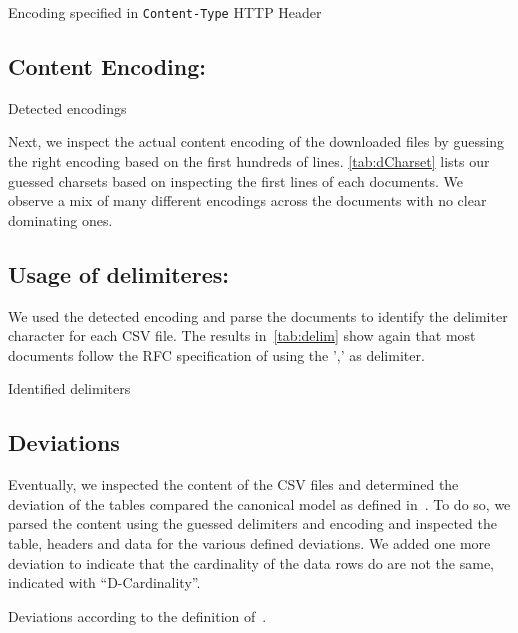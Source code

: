 \documentclass{scrartcl}
\begin{document}
\begin{table}[h]
\centering

\caption{Encoding specified in  \texttt{Content-Type} \textsc{HTTP} Header\label{tab:hCharset}}
\end{table}

\subsection{Content Encoding:}
\begin{table}[h]
\centering

\caption{Detected encodings\label{tab:dCharset}}
\end{table}

Next, we inspect the actual content encoding of the downloaded files by guessing the right encoding based on the first hundreds of lines. 
\autoref{tab:dCharset} lists our guessed charsets based on inspecting the first lines of each documents.  
We observe a mix of  many different encodings across the documents with no clear dominating ones. 


\subsection{Usage of delimiteres:}
We used the detected encoding and parse the documents to identify the delimiter character for each CSV file. 
The results in~\autoref{tab:delim} show again that most documents follow the RFC specification of using the ',' as delimiter.
\begin{table}[h]
\centering

\caption{Identified delimiters\label{tab:delim}}
\end{table}

\subsection{Deviations}
Eventually, we inspected the content of the CSV files and determined the deviation of the tables compared the canonical model as defined in~\cite{ermilov:2013aa}.
To do so, we parsed the content using the guessed delimiters and encoding and inspected the table, headers and data for the various defined deviations. 
We added one more deviation to indicate that the cardinality of the data rows do are not the same, indicated with ``D-Cardinality''.

\begin{table}[h]
\centering

\caption{Deviations according to the definition of~\cite{ermilov:2013aa}\label{tab:deviations}.}
\end{table}
\end{document}
